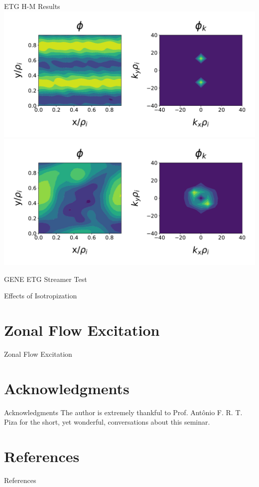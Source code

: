 \documentclass[aspectratio=43]{beamer}
\begin{document}
   \begin{frame}{ETG H-M Results}
      \includegraphics[scale=.25]{Images/hmPhiETG_init.pdf}
      \includegraphics[scale=.25]{Images/hmPhiETG_iso.pdf}
   \end{frame}

   \begin{frame}{GENE ETG Streamer Test}
      
   \end{frame}

   \begin{frame}{Effects of Isotropization}
      
   \end{frame}

   \section{Zonal Flow Excitation}

   \begin{frame}{Zonal Flow Excitation}
   \end{frame}
   
   \section*{Acknowledgments} %
      \begin{frame}{Acknowledgments}
          The author is extremely thankful to Prof. Antônio F. R. T. Piza for the short, yet wonderful, conversations about this seminar.
      \end{frame}
   
   \section*{References}
      \begin{frame}{References}
      \end{frame}
\end{document}
